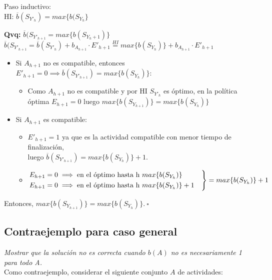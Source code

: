 \documentclass[10pt, a4paper]{article}
\begin{document}
Paso inductivo: \\

HI: $\overline{b}(S_{Y'_h}) = max\{b(S_{Y_h}\}$  

\textbf{Qvq:} $\overline{b}(S_{Y'_{h+1}} = max\{b(S_{Y_h+1})\}$ \\

$\overline{b}(S_{Y'_{h+1}} = \overline{b}(S_{Y'_h}) + b_{A_{h+1}} \cdot E'_{h+1} \overset{HI}{=} max\{b(S_{Y_h})\} + b_{A_{h+1}} \cdot E'_{h+1}$

\begin{itemize}
    \item Si $A_{h+1}$ no es compatible, entonces $E'_{h+1} = 0 \implies \overline{b}(S_{Y'_{h+1}}) = max\{b(S_{Y_h})\}$: \begin{itemize}
        \item Como $A_{h+1}$ no es compatible y por HI $S_{Y'_h}$ es óptimo, en la política óptima $E_{h+1} = 0$ luego $max\{b(S_{Y_{h+1}})\} = max\{b(S_{Y_h})\}$
        \end{itemize}
    \item Si $A_{h+1}$ es compatible: \begin{itemize}
        \item $E'_{h+1} = 1$ ya que es la actividad compatible con menor tiempo de finalización, \\ luego $\overline{b}(S_{Y'_{h+1}}) = max\{b(S_{Y_h})\} + 1$.
        \item $$\begin{rcases} E_{h+1} = 0 \implies \text{en el óptimo hasta h} \ max\{b(S_{Y_h})\} & \\
              E_{h+1} = 0 \implies \text{en el óptimo hasta h} \ max\{b(S_{Y_h})\} + 1 & 
            \end{rcases} = max\{b(S_{Y_h})\} + 1$$
    \end{itemize}
\end{itemize}

Entonces, $max\{b(S_{Y_{h+1}})\} = max\{b(S_{Y_h})\}. \ \square$

\subsection{Contraejemplo para caso general}
\emph{Mostrar que la solución no es correcta cuando $b(A)$ no es necesariamente 1 para todo A.} \\

Como contraejemplo, considerar el siguiente conjunto $A$ de actividades: \\
\end{document}
